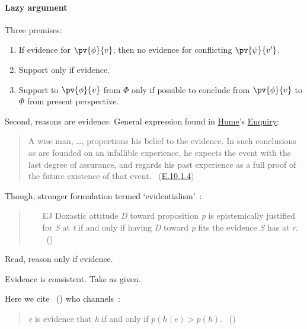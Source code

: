 \paragraph{Lazy argument}

\begin{note}
  Three premises:
  \begin{enumerate}
  \item
    \label{lazy:evidence-constraint}
    If evidence for \(\pv{\phi}{v}\), then no evidence for conflicting \(\pv{\psi}{v'}\).
  \item
    \label{lazy:evidence}
    Support only if evidence.
  \item
    \label{lazy:reason}
    Support to \(\pv{\phi}{v}\) from \(\Phi\) only if possible to conclude from \(\pv{\phi}{v}\) to \(\Phi\) from present perspective.
  \end{enumerate}

  Second, reasons are evidence.
  General expression found in \hyperlink{cite.Hume:1748tp}{Hume}'s \hyperlink{cite.Hume:1748tp}{Enquiry}:
  \begin{quote}
    A wise man, \dots, proportions his belief to the evidence.
    In such conclusions as are founded on an infallible experience, he expects the event with the last degree of assurance, and regards his past experience as a full proof of the future existence of that event.%
    \mbox{ }\hfill\mbox{(\hyperlink{cite.Hume:1748tp}{E.10.1.4})}
  \end{quote}

  Though, stronger formulation termed `evidentialism'~\citeauthor{Feldman:1985wx}:

  \begin{quote}
    \begin{enumerate}
    \item[EJ] Doxastic attitude \emph{D} toward proposition \emph{p} is epistemically justified for \emph{S} at \emph{t} if and only if having \emph{D} toward \emph{p} fits the evidence \emph{S} has at \emph{r}.%
      \mbox{ }\hfill\mbox{(\citeyear[15]{Feldman:1985wx})}
    \end{enumerate}
  \end{quote}

  Read, reason only if evidence.

  Evidence is consistent.
  Take as given.

  Here we cite~\citeauthor{Achinstein:2001ub} (\citeauthor{Achinstein:2001ub}) who channels~\textcite{Carnap:1962ue}:

  \begin{quote}
    \emph{e} is evidence that \emph{h} if and only if \(p(h \mid e) > p(h)\).%
    \mbox{ }\hfill\mbox{(\citeauthor[45]{Achinstein:2001ub})}
  \end{quote}


\end{note}
